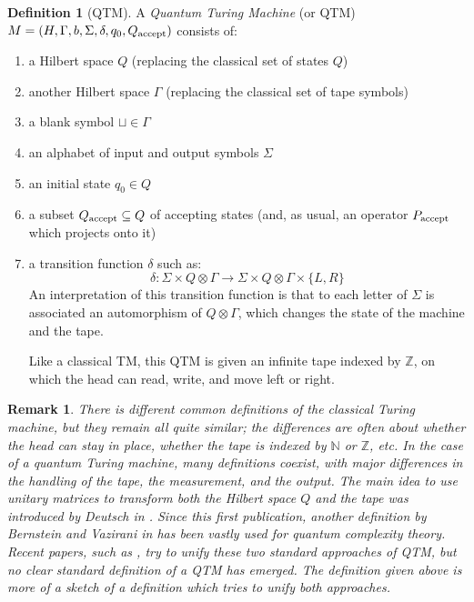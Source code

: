 \documentclass[12pt,a4paper]{article}
\theoremstyle{plain}
\newtheorem*{remark}{Remark}
\theoremstyle{definition}
\newtheorem*{definition}{Definition}
\begin{document}
\begin{definition}[QTM] A \emph{Quantum Turing Machine} (or QTM) $M = (H, \Gamma, b, \Sigma, \delta, q_0, Q_{\textnormal{accept}})$ consists of:
\begin{enumerate}[label=--, noitemsep]
    \item a Hilbert space $Q$ (replacing the classical set of states $Q$)
    \item another Hilbert space $\Gamma$ (replacing the classical set of tape symbols)
    \item a blank symbol $\sqcup\in \Gamma$
    \item an alphabet of input and output symbols $\Sigma$
    \item an initial state $q_0\in Q$
    \item a subset $Q_{\textnormal{accept}}\subseteq Q$ of accepting states (and, as usual, an operator $P_{\textnormal{accept}}$ which projects onto it)
    \item a transition function $\delta$ such as:
    \begin{equation*}
        \delta : \Sigma \times Q\otimes \Gamma \to \Sigma \times Q\otimes \Gamma \times \{L, R\}
    \end{equation*}
    An interpretation of this transition function is that to each letter of $\Sigma$ is associated an automorphism of $Q\otimes \Gamma$, which changes the state of the machine and the tape. 

    Like a classical TM, this QTM is given an infinite tape indexed by $\mathbb{Z}$, on which the head can read, write, and move left or right.

\end{enumerate}

\begin{remark}
    There is different common definitions of the classical Turing machine, but they remain all quite similar; the differences are often about whether the head can stay in place, whether the tape is indexed by $\mathbb{N}$ or $\mathbb{Z}$, etc. In the case of a quantum Turing machine, many definitions coexist, with major differences in the handling of the tape, the measurement, and the output. The main idea to use unitary matrices to transform both the Hilbert space $Q$ and the tape was introduced by Deutsch in \cite{deutsch-qtm}. Since this first publication, another definition by Bernstein and Vazirani in \cite{qc-theory-bernstein} has been vastly used for quantum complexity theory. Recent papers, such as \cite{guerrini}, try to unify these two standard approaches of QTM, but no clear standard definition of a QTM has emerged. The definition given above is more of a sketch of a definition which tries to unify both approaches.
\end{remark}

\end{definition}
\end{document}
